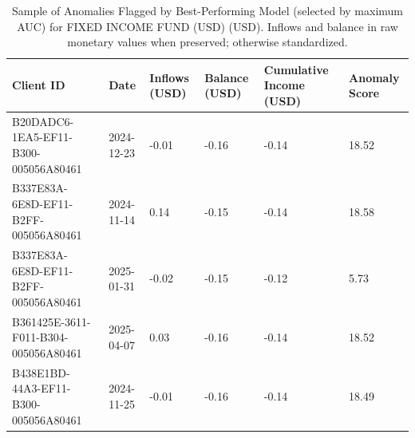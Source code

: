 \documentclass[11pt]{article}
\begin{document}
\begin{table}[h]

\centering

\caption{Sample of Anomalies Flagged by Best-Performing Model (selected by maximum AUC) for FIXED INCOME FUND (USD) (USD). Inflows and balance in raw monetary values when preserved; otherwise standardized.}

\begin{tabular}{llllll}

\hline

Client ID & Date & Inflows (USD) & Balance (USD) & Cumulative Income (USD) & Anomaly Score \\

\hline

B20DADC6-1EA5-EF11-B300-005056A80461 & 2024-12-23 & -0.01 & -0.16 & -0.14 & 18.52 \\

B337E83A-6E8D-EF11-B2FF-005056A80461 & 2024-11-14 & 0.14 & -0.15 & -0.14 & 18.58 \\

B337E83A-6E8D-EF11-B2FF-005056A80461 & 2025-01-31 & -0.02 & -0.15 & -0.12 & 5.73 \\

B361425E-3611-F011-B304-005056A80461 & 2025-04-07 & 0.03 & -0.16 & -0.14 & 18.52 \\

B438E1BD-44A3-EF11-B300-005056A80461 & 2024-11-25 & -0.01 & -0.16 & -0.14 & 18.49 \\

\hline

\end{tabular}

\end{table}
\end{document}
